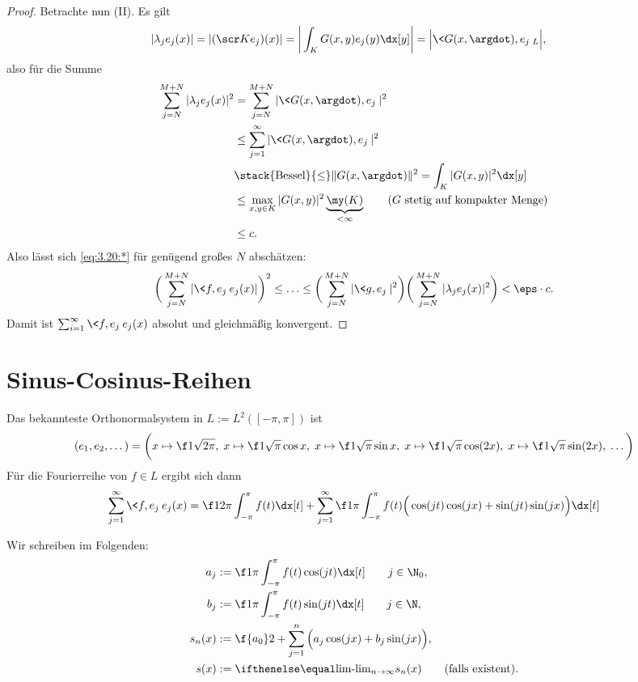\begin{st}
\begin{proof}
		Betrachte nun (II).
		Es gilt
		\begin{align*}
			|\lambda_j e_j(x)|
			= |(\scr K e_j)(x)|
			&= \bigg|\int_{K} G(x,y) e_j(y) \dx[y]\bigg|
			= \Big|\<G(x,\argdot), e_j \>_L \Big|,
		\end{align*}
		also für die Summe
		\begin{align*}
			\sum_{j=N}^{M+N} |\lambda_j e_j(x)|^2
			&= \sum_{j=N}^{M+N} |\<G(x,\argdot), e_j\>|^2 \\
			&\le \sum_{j=1}^\infty |\<G(x,\argdot), e_j\>|^2 \\
			&\stack{\text{Bessel}}{\le} \|G(x,\argdot)\|^2
			= \int_K |G(x,y)|^2 \dx[y]\\
			&\le \max_{x,y \in K} |G(x,y)|^2 \underbrace{\my(K)}_{< \infty}  \qquad \text{($G$ stetig auf kompakter Menge)} \\
			&\le c.
		\end{align*}
		Also lässt sich \eqref{eq:3.20:*} für genügend großes $N$ abschätzen:
		\[
			\bigg( \sum_{j=N}^{M+N} |\<f,e_j\> e_j(x) | \bigg)^2
			\le \dotsc \le
			\bigg( \sum_{j=N}^{M+N} |\<g,e_j\>|^2 \bigg) \bigg(\sum_{j=N}^{M+N}|\lambda_j e_j(x)|^2\bigg)
			< \eps \cdot c.
		\]
		Damit ist $\sum_{i=1}^\infty \<f,e_j\>e_j(x)$ absolut und gleichmäßig konvergent.
	\end{proof}
\end{st}


\section{Sinus-Cosinus-Reihen}

Das bekannteste Orthonormalsystem in $L := L^2([-\pi, \pi])$ ist
\begin{align*}
	(e_1, e_2, \dotsc ) = \bigg( x \mapsto \f 1{\sqrt{2\pi}},\;
	x \mapsto \f 1{\sqrt \pi} \cos x,\;
	x \mapsto \f 1{\sqrt \pi} \sin x, \;
	x \mapsto \f 1{\sqrt \pi} \cos(2x), \;
	x \mapsto \f 1{\sqrt \pi} \sin(2x),\; \dotsc \bigg)
\end{align*}
Für die Fourierreihe von $f \in L$ ergibt sich dann
\begin{align*}
	\sum_{j=1}^\infty \<f,e_j\> e_j(x)
	= \f 1{2\pi} \int_{-\pi}^{\pi} f(t) \dx[t] + \sum_{j=1}^\infty \f 1{\pi} \int_{-\pi}^{\pi} f(t) \Big( \cos(jt) \cos(jx) + \sin(jt) \sin(jx) \Big) \dx[t]
\end{align*}

\begin{nt}[Notation] \label{3.21}
	Wir schreiben im Folgenden:
	\begin{align*}
		a_j &:= \f 1{\pi} \int_{-\pi}^{\pi} f(t) \cos(jt) \dx[t] \qquad j\in \N_0, \\
		b_j &:= \f 1{\pi} \int_{-\pi}^{\pi} f(t) \sin(jt) \dx[t] \qquad j\in \N, \\
		s_n(x) &:= \f {a_0}2 + \sum_{j=1}^n \Big( a_j \cos(jx) + b_j \sin(jx) \Big), \\
		s(x) &:= \lim_{n\to \infty} s_n(x) \qquad \text{(falls existent)}.
	\end{align*}
\end{nt}

